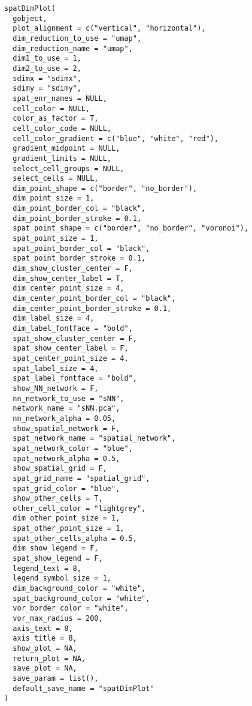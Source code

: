 \documentclass[a4paper]{book}
\begin{document}
\begin{Usage}
\begin{verbatim}
spatDimPlot(
  gobject,
  plot_alignment = c("vertical", "horizontal"),
  dim_reduction_to_use = "umap",
  dim_reduction_name = "umap",
  dim1_to_use = 1,
  dim2_to_use = 2,
  sdimx = "sdimx",
  sdimy = "sdimy",
  spat_enr_names = NULL,
  cell_color = NULL,
  color_as_factor = T,
  cell_color_code = NULL,
  cell_color_gradient = c("blue", "white", "red"),
  gradient_midpoint = NULL,
  gradient_limits = NULL,
  select_cell_groups = NULL,
  select_cells = NULL,
  dim_point_shape = c("border", "no_border"),
  dim_point_size = 1,
  dim_point_border_col = "black",
  dim_point_border_stroke = 0.1,
  spat_point_shape = c("border", "no_border", "voronoi"),
  spat_point_size = 1,
  spat_point_border_col = "black",
  spat_point_border_stroke = 0.1,
  dim_show_cluster_center = F,
  dim_show_center_label = T,
  dim_center_point_size = 4,
  dim_center_point_border_col = "black",
  dim_center_point_border_stroke = 0.1,
  dim_label_size = 4,
  dim_label_fontface = "bold",
  spat_show_cluster_center = F,
  spat_show_center_label = F,
  spat_center_point_size = 4,
  spat_label_size = 4,
  spat_label_fontface = "bold",
  show_NN_network = F,
  nn_network_to_use = "sNN",
  network_name = "sNN.pca",
  nn_network_alpha = 0.05,
  show_spatial_network = F,
  spat_network_name = "spatial_network",
  spat_network_color = "blue",
  spat_network_alpha = 0.5,
  show_spatial_grid = F,
  spat_grid_name = "spatial_grid",
  spat_grid_color = "blue",
  show_other_cells = T,
  other_cell_color = "lightgrey",
  dim_other_point_size = 1,
  spat_other_point_size = 1,
  spat_other_cells_alpha = 0.5,
  dim_show_legend = F,
  spat_show_legend = F,
  legend_text = 8,
  legend_symbol_size = 1,
  dim_background_color = "white",
  spat_background_color = "white",
  vor_border_color = "white",
  vor_max_radius = 200,
  axis_text = 8,
  axis_title = 8,
  show_plot = NA,
  return_plot = NA,
  save_plot = NA,
  save_param = list(),
  default_save_name = "spatDimPlot"
)
\end{verbatim}
\end{Usage}
%
\end{document}
